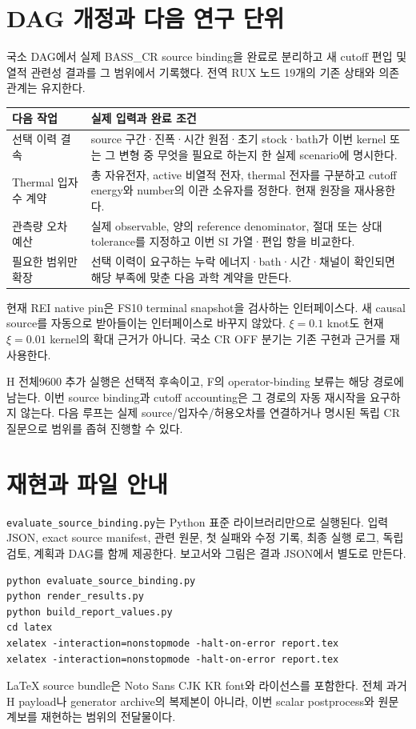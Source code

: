 \documentclass[11pt,a4paper]{article}
\begin{document}
\section{DAG 개정과 다음 연구 단위}

국소 DAG에서 실제 BASS\_CR source binding을 완료로 분리하고 새 cutoff 편입 및 열적 관련성
결과를 그 범위에서 기록했다. 전역 RUX 노드 19개의 기존 상태와 의존관계는 유지한다.

\begin{center}
\begin{tabular}{P{.26\linewidth}P{.63\linewidth}}
\toprule
다음 작업 & 실제 입력과 완료 조건\\
\midrule
선택 이력 결속 & source 구간·진폭·시간 원점·초기 stock·bath가 이번 kernel 또는 그 변형 중
무엇을 필요로 하는지 한 실제 scenario에 명시한다.\\
Thermal 입자수 계약 & 총 자유전자, active 비열적 전자, thermal 전자를 구분하고 cutoff energy와
number의 이관 소유자를 정한다. 현재 원장을 재사용한다.\\
관측량 오차 예산 & 실제 observable, 양의 reference denominator, 절대 또는 상대 tolerance를
지정하고 이번 SI 가열·편입 항을 비교한다.\\
필요한 범위만 확장 & 선택 이력이 요구하는 누락 에너지·bath·시간·채널이 확인되면 해당 부족에
맞춘 다음 과학 계약을 만든다.\\
\bottomrule
\end{tabular}
\end{center}

현재 REI native pin은 FS10 terminal snapshot을 검사하는 인터페이스다.
새 causal source를 자동으로 받아들이는 인터페이스로 바꾸지 않았다.
\(\xi=0.1\) knot도 현재 \(\xi=0.01\) kernel의 확대 근거가 아니다.
국소 CR OFF 분기는 기존 구현과 근거를 재사용한다.

H 전체9600 추가 실행은 선택적 후속이고, F의 operator-binding 보류는 해당 경로에 남는다.
이번 source binding과 cutoff accounting은 그 경로의 자동 재시작을 요구하지 않는다.
다음 루프는 실제 source/입자수/허용오차를 연결하거나 명시된 독립 CR 질문으로 범위를 좁혀
진행할 수 있다.

\section{재현과 파일 안내}

\texttt{evaluate\_source\_binding.py}는 Python 표준 라이브러리만으로 실행된다.
입력 JSON, exact source manifest, 관련 원문, 첫 실패와 수정 기록, 최종 실행 로그, 독립 검토,
계획과 DAG를 함께 제공한다. 보고서와 그림은 결과 JSON에서 별도로 만든다.
\begin{verbatim}
python evaluate_source_binding.py
python render_results.py
python build_report_values.py
cd latex
xelatex -interaction=nonstopmode -halt-on-error report.tex
xelatex -interaction=nonstopmode -halt-on-error report.tex
\end{verbatim}
LaTeX source bundle은 Noto Sans CJK KR font와 라이선스를 포함한다.
전체 과거 H payload나 generator archive의 복제본이 아니라, 이번 scalar postprocess와
원문 계보를 재현하는 범위의 전달물이다.
\end{document}
